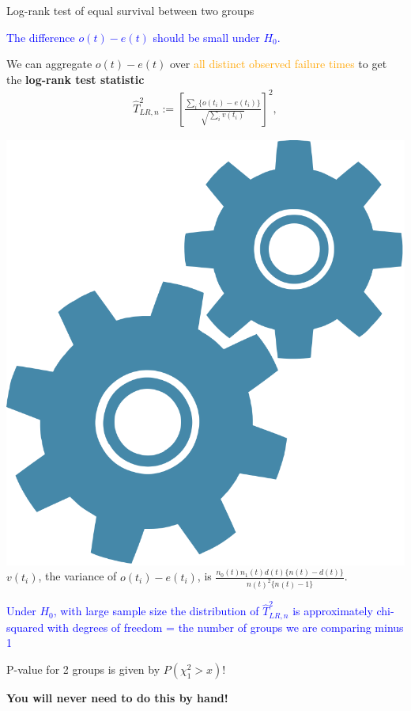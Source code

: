 \documentclass[10pt,t]{beamer}
\begin{document}
\begin{frame}{Log-rank test of equal survival between two groups }
\vspace{-7 mm}

\textcolor{blue}{The difference $o(t) - e(t)$ should be small under $H_0$.} 

\medskip

We can aggregate $o(t) - e(t)$ over \textcolor{orange}{all distinct observed failure times} to get the \textbf{log-rank test statistic}
\begin{align*}
\widehat{T}^2_{LR, n} := \left[\frac{\sum_i \{o(t_i) - e(t_i)\}}{\sqrt{\sum_iv(t_i)}} \right]^2,
\end{align*}

\medskip

\includegraphics[scale = 0.015]{figs/technical} $v(t_i)$, the variance of $o(t_i)-e(t_i)$, is $\frac{n_0(t)n_1(t)d(t)\{n(t)-d(t)\}}{n(t)^2\{n(t) - 1\}}$.

\medskip

\textcolor{blue}{Under $H_0$, with large sample size the distribution of $\widehat{T}^2_{LR, n}$ is approximately chi-squared with degrees of freedom = the number of groups we are comparing minus 1}

\medskip

P-value for 2 groups is given by $P(\chi^2_1 > x)$!
\medskip 

\textbf{You will never need to do this by hand!}
\end{frame}
\end{document}
